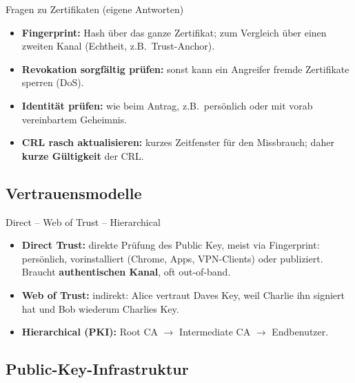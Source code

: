 \documentclass[a4paper, fontsize=7pt]{scrartcl}
\begin{document}
\begin{subbox}{Fragen zu Zertifikaten (eigene Antworten)}
\begin{itemize}
    \item \textbf{Fingerprint:} Hash über das ganze Zertifikat; zum Vergleich
          über einen zweiten Kanal (Echtheit, z.B.\ Trust-Anchor).
    \item \textbf{Revokation sorgfältig prüfen:} sonst kann ein Angreifer fremde
          Zertifikate sperren (DoS).
    \item \textbf{Identität prüfen:} wie beim Antrag, z.B.\ persönlich oder mit
          vorab vereinbartem Geheimnis.
    \item \textbf{CRL rasch aktualisieren:} kurzes Zeitfenster für den
          Missbrauch; daher \textbf{kurze Gültigkeit} der CRL.
\end{itemize}
\end{subbox}

\subsection{Vertrauensmodelle}

\begin{mainbox}{Direct -- Web of Trust -- Hierarchical}
\begin{itemize}
    \item \textbf{Direct Trust:} direkte Prüfung des Public Key, meist via
          Fingerprint: persönlich, vorinstalliert (Chrome, Apps, VPN-Clients)
          oder publiziert. Braucht \textbf{authentischen Kanal}, oft out-of-band.
    \item \textbf{Web of Trust:} indirekt: Alice vertraut Daves Key, weil Charlie
          ihn signiert hat und Bob wiederum Charlies Key.
    \item \textbf{Hierarchical (PKI):} Root CA $\to$ Intermediate CA $\to$
          Endbenutzer.
\end{itemize}
\end{mainbox}

\subsection{Public-Key-Infrastruktur}
\end{document}
